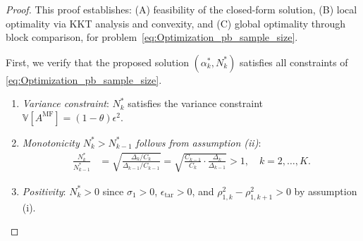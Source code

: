 \begin{proof}
This proof establishes: (A) feasibility of the closed-form solution, (B) local optimality via KKT analysis and convexity, and (C) global optimality through block comparison, for problem~\eqref{eq:Optimization_pb_sample_size}.

\medskip
{}

First, we verify that the proposed solution $(\alpha_k^*, N_k^*)$ satisfies all constraints of \eqref{eq:Optimization_pb_sample_size}.
\begin{enumerate}
    \item \textit{Variance constraint}: $N_k^*$ satisfies the variance constraint $\mathbb{V}[A^{\text{MF}}] = (1-\theta)\epsilon^2$.
    
    \item \textit{Monotonicity $N_k^* > N_{k-1}^*$ follows from assumption (ii)}:
    \begin{align*}
    \frac{N_k^*}{N_{k-1}^*} &= \sqrt{ \frac{\Delta_k/C_k}{\Delta_{k-1}/C_{k-1}} } = \sqrt{ \frac{C_{k-1}}{C_k} \cdot \frac{\Delta_k}{\Delta_{k-1}}} > 1,\quad k=2,\ldots,K.
    \end{align*}
    
    \item \textit{Positivity}: $N_k^* > 0$ since $\sigma_1 > 0$, $\epsilon_{\text{tar}} > 0$, and $\rho_{1,k}^2 - \rho_{1,k+1}^2 > 0$ by assumption (i).
\end{enumerate}

\medskip
{}


\end{proof}
